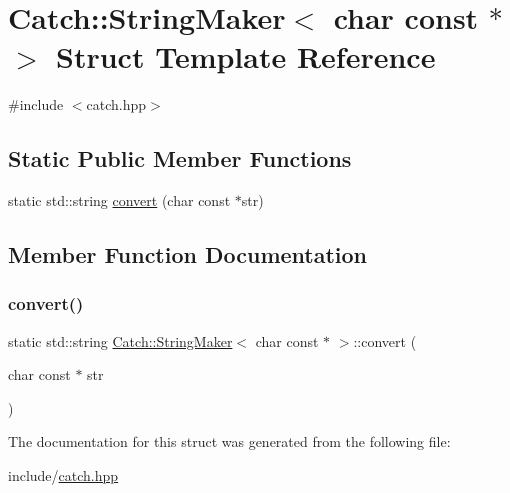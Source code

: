 \hypertarget{structCatch_1_1StringMaker_3_01char_01const_01_5_01_4}{}\section{Catch\+:\+:String\+Maker$<$ char const $\ast$ $>$ Struct Template Reference}
\label{structCatch_1_1StringMaker_3_01char_01const_01_5_01_4}


{\ttfamily \#include $<$catch.\+hpp$>$}

\subsection*{Static Public Member Functions}
\begin{DoxyCompactItemize}
\item 
static std\+::string \mbox{\hyperlink{structCatch_1_1StringMaker_3_01char_01const_01_5_01_4_a20813965ad59cdf6d1f874f47158432d}{convert}} (char const $\ast$str)
\end{DoxyCompactItemize}


\subsection{Member Function Documentation}
\mbox{\label{structCatch_1_1StringMaker_3_01char_01const_01_5_01_4_a20813965ad59cdf6d1f874f47158432d}} 
\subsubsection{\texorpdfstring{convert()}{convert()}}
{\footnotesize\ttfamily static std\+::string \mbox{\hyperlink{structCatch_1_1StringMaker}{Catch\+::\+String\+Maker}}$<$ char const $\ast$ $>$\+::convert (\begin{DoxyParamCaption}\item[{char const $\ast$}]{str }\end{DoxyParamCaption})\hspace{0.3cm}{\ttfamily [static]}}



The documentation for this struct was generated from the following file\+:\begin{DoxyCompactItemize}
\item 
include/\mbox{\hyperlink{catch_8hpp}{catch.\+hpp}}\end{DoxyCompactItemize}
